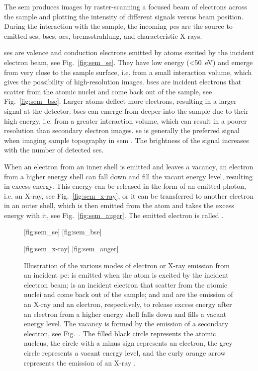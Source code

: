 The \ac{sem} produces images by raster-scanning a focused beam of electrons across the sample and plotting the intensity of different signals versus beam position. During the interaction with the sample, the incoming \acp{pe} are the source to emitted \acp{se}, \acp{bse}, \acp{ae}, bremsstrahlung, and characteristic X-rays. 

\Acp{se} are valence and conduction electrons emitted by atoms excited by the incident electron beam, see Fig.~\ref{fig:sem_se}. They have low energy (\SI{<50}{\electronvolt}) and emerge from very close to the sample surface, i.e. from a small interaction volume, which gives the possibility of high-resolution images. \Acp{bse} are incident electrons that scatter from the atomic nuclei and come back out of the sample, see Fig.~\ref{fig:sem_bse}. Larger atoms deflect more electrons, resulting in a larger signal at the detector. \Acp{bse} can emerge from deeper into the sample due to their high energy, i.e. from a greater interaction volume, which can result in a poorer resolution than secondary electron images. \Ac{se} is generally the preferred signal when imaging sample topography in \ac{sem} \citep{sealy2000mechanism}. The brightness of the signal increases with the number of detected \acp{se}. 

When an electron from an inner shell is emitted and leaves a vacancy, an electron from a higher energy shell can fall down and fill the vacant energy level, resulting in excess energy. This energy can be released in the form of an emitted photon, i.e. an X-ray, see Fig.~\ref{fig:sem_x-ray}, or it can be transferred to another electron in an outer shell, which is then emitted from the atom and takes the excess energy with it, see Fig.~\ref{fig:sem_auger}. The emitted electron is called .

\begin{figure}[htbp]
    \centering
    [fig:sem_se]
    \hfill
    [fig:sem_bse]
    \par\bigskip
    [fig:sem_x-ray]
    \hfill
    [fig:sem_auger]
    \caption[Illustration of the various modes of electron or X-ray emission from an incident electron.]{Illustration of the various modes of electron or X-ray emission from an incident \acf{pe}:   is emitted when the atom is excited by the incident electron beam;   is an incident electron that scatter from the atomic nuclei and come back out of the sample; and  and  are the emission of an X-ray and an electron, respectively, to release excess energy after an electron from a higher energy shell falls down and fills a vacant energy level. The vacancy is formed by the emission of a secondary electron, see Fig.~. The filled black circle represents the atomic nucleus, the circle with a minus sign represents an electron, the grey circle represents a vacant energy level, and the curly orange arrow represents the emission of an X-ray \citep[Adapted from][]{goldstein2012scanning}.}
    \label{fig:sem_ill}
\end{figure}



